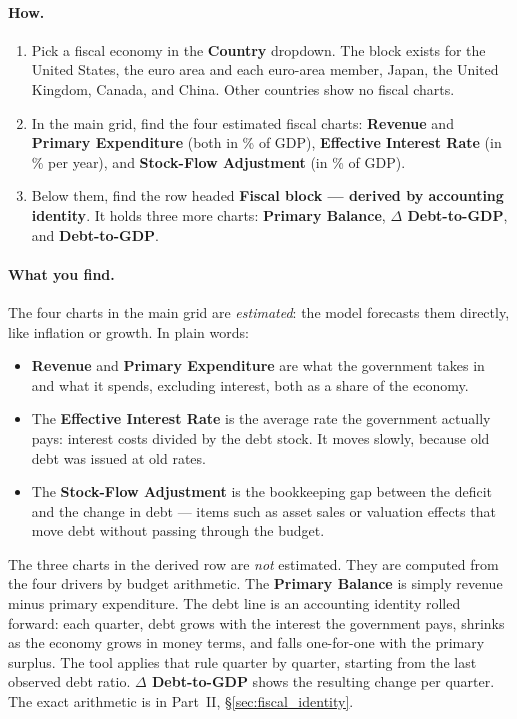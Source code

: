\documentclass[11pt]{article}
\theoremstyle{definition}
\theoremstyle{remark}
\begin{document}
\paragraph{How.}
\begin{enumerate}
  \item Pick a fiscal economy in the \textbf{Country} dropdown. The block exists for the
    United States, the euro area and each euro-area member, Japan, the United Kingdom, Canada,
    and China. Other countries show no fiscal charts.
  \item In the main grid, find the four estimated fiscal charts: \textbf{Revenue} and
    \textbf{Primary Expenditure} (both in \% of GDP), \textbf{Effective Interest Rate}
    (in \% per year), and \textbf{Stock-Flow Adjustment} (in \% of GDP).
  \item Below them, find the row headed \textbf{Fiscal block --- derived by accounting
    identity}. It holds three more charts: \textbf{Primary Balance}, \textbf{$\Delta$
    Debt-to-GDP}, and \textbf{Debt-to-GDP}.
\end{enumerate}

\paragraph{What you find.} The four charts in the main grid are \emph{estimated}: the model
forecasts them directly, like inflation or growth. In plain words:
\begin{itemize}
  \item \textbf{Revenue} and \textbf{Primary Expenditure} are what the government takes in and
    what it spends, excluding interest, both as a share of the economy.
  \item The \textbf{Effective Interest Rate} is the average rate the government actually pays:
    interest costs divided by the debt stock. It moves slowly, because old debt was issued at
    old rates.
  \item The \textbf{Stock-Flow Adjustment} is the bookkeeping gap between the deficit and the
    change in debt --- items such as asset sales or valuation effects that move debt without
    passing through the budget.
\end{itemize}
The three charts in the derived row are \emph{not} estimated. They are computed from the four
drivers by budget arithmetic. The \textbf{Primary Balance} is simply revenue minus primary
expenditure. The debt line is an accounting identity rolled forward: each quarter, debt grows
with the interest the government pays, shrinks as the economy grows in money terms, and falls
one-for-one with the primary surplus. The tool applies that rule quarter by quarter, starting
from the last observed debt ratio. \textbf{$\Delta$ Debt-to-GDP} shows the resulting change per
quarter. The exact arithmetic is in Part~II, \S\ref{sec:fiscal_identity}.
\end{document}
